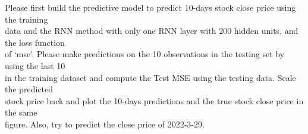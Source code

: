 \documentclass[
]{article}
\newenvironment{Shaded}{\begin{snugshade}}{\end{snugshade}}
\newcommand{\AttributeTok}[1]{\textcolor[rgb]{0.13,0.29,0.53}{#1}}
\newcommand{\CommentTok}[1]{\textcolor[rgb]{0.56,0.35,0.01}{\textit{#1}}}
\newcommand{\DataTypeTok}[1]{\textcolor[rgb]{0.13,0.29,0.53}{#1}}
\newcommand{\DecValTok}[1]{\textcolor[rgb]{0.00,0.00,0.81}{#1}}
\newcommand{\FunctionTok}[1]{\textcolor[rgb]{0.13,0.29,0.53}{\textbf{#1}}}
\newcommand{\NormalTok}[1]{#1}
\newcommand{\OtherTok}[1]{\textcolor[rgb]{0.56,0.35,0.01}{#1}}
\newcommand{\SpecialCharTok}[1]{\textcolor[rgb]{0.81,0.36,0.00}{\textbf{#1}}}
\newcommand{\StringTok}[1]{\textcolor[rgb]{0.31,0.60,0.02}{#1}}
\begin{document}
\begin{Shaded}
\end{Shaded}

Please first build the predictive model to predict 10-days stock close
price using the training\\
data and the RNN method with only one RNN layer with 200 hidden units,
and the loss function\\
of `mse'. Please make predictions on the 10 observations in the testing
set by using the last 10\\
in the training dataset and compute the Test MSE using the testing data.
Scale the predicted\\
stock price back and plot the 10-days predictions and the true stock
close price in the same\\
figure. Also, try to predict the close price of 2022-3-29.
\end{document}
